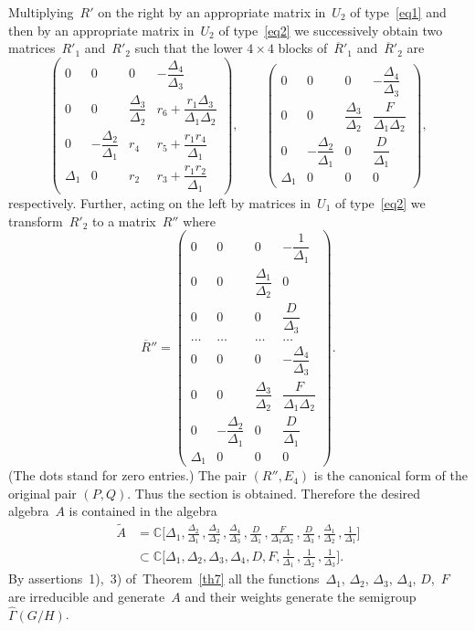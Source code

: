 \documentclass[12pt]{amsart}
\theoremstyle{definition}
\theoremstyle{remark}
\begin{document}
Multiplying~$R'$ on the right by an appropriate matrix in~$U_2$ of
type~\eqref{eq1} and then by an appropriate matrix in~$U_2$ of
type~\eqref{eq2} we successively obtain two matrices~$R'_1$
and~$R'_2$ such that the lower $4\times 4$ blocks of~$\overline
R{}'_1$ and~$\overline R{}'_2$ are
$$
\begin{pmatrix}
0 & 0 & 0 & -\dfrac{\Delta_4}{\Delta_3}
\\[3mm]
0 & 0 & \dfrac{\Delta_3}{\Delta_2} &
r_6+\dfrac{r_1\Delta_3}{\Delta_1\Delta_2}
\\[3mm]
0 & -\dfrac{\Delta_2}{\Delta_1} & r_4 & r_5+\dfrac{r_1r_4}{\Delta_1}
\\[3mm]
\Delta_1 & 0 & r_2 & r_3+\dfrac{r_1r_2}{\Delta_1}
\end{pmatrix},\qquad
\begin{pmatrix}
0 & 0 & 0 & -\dfrac{\Delta_4}{\Delta_3}
\\[3mm]
0 & 0 & \dfrac{\Delta_3}{\Delta_2} & \dfrac{F}{\Delta_1\Delta_2}
\\[3mm]
0 & -\dfrac{\Delta_2}{\Delta_1} & 0 & \dfrac{D}{\Delta_1}
\\[3mm]
\Delta_1 & 0 & 0 & 0
\end{pmatrix},
$$
respectively. Further, acting on the left by matrices in~$U_1$ of
type~\eqref{eq2} we transform~$R'_2$ to a matrix~$R''$ where
$$
\overline R{}''=\begin{pmatrix} 0 & 0 & 0 & -\dfrac{1}{\Delta_1}
\\
0 & 0 & \dfrac{\Delta_1}{\Delta_2} & 0
\\
0 & 0 & 0 & \dfrac{D}{\Delta_3}
\\
\hdots & \hdots & \hdots & \hdots
\\
0 & 0 & 0 & -\dfrac{\Delta_4}{\Delta_3}
\\[3mm]
0 & 0 & \dfrac{\Delta_3}{\Delta_2} & \dfrac{F}{\Delta_1\Delta_2}
\\[3mm]
0 & -\dfrac{\Delta_2}{\Delta_1} & 0 & \dfrac{D}{\Delta_1}
\\
\Delta_1 & 0 & 0 & 0
\end{pmatrix}.
$$
(The dots stand for zero entries.) The pair $(R'',E_4)$ is the
canonical form of the original pair $(P,Q)$. Thus the section is
obtained. Therefore the desired algebra~$A$ is contained in the
algebra
\begin{align*}
\tilde A&=\mathbb{C}\biggl[\Delta_1,\frac{\Delta_2}{\Delta_1}\,,
\frac{\Delta_3}{\Delta_2}\,,\frac{\Delta_4}{\Delta_3}\,,\frac{D}{\Delta_1}\,,
\frac{F}{\Delta_1\Delta_2}\,,\frac{D}{\Delta_3}\,,\frac{\Delta_1}{\Delta_2}\,,
\frac{1}{\Delta_1}\biggr]
\\
&\subset\mathbb{C}\biggl[\Delta_1,\Delta_2,\Delta_3,\Delta_4,D,F,
\frac{1}{\Delta_1}\,,\frac{1}{\Delta_2}\,,\frac{1}{\Delta_3}\biggr].
\end{align*}
By assertions~1),~3) of\, Theorem~\ref{th7} all the
functions~$\Delta_1$, $\Delta_2$, $\Delta_3$, $\Delta_4$, $D$,~$F$
are irreducible and generate~$A$ and their weights generate the
semigroup~$\widehat\Gamma(G/H)$.
\end{document}
